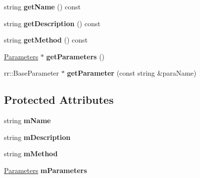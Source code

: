 \begin{DoxyCompactItemize}
\item 
\hypertarget{classrr_1_1_capability_a4702e391046b50e4401097f944d4e871}{string {\bfseries get\-Name} () const }\label{classrr_1_1_capability_a4702e391046b50e4401097f944d4e871}

\item 
\hypertarget{classrr_1_1_capability_ab68dd9acb7970dfefb83887f43216ead}{string {\bfseries get\-Description} () const }\label{classrr_1_1_capability_ab68dd9acb7970dfefb83887f43216ead}

\item 
\hypertarget{classrr_1_1_capability_ac160de57c4711c5f7b4809f9e476c792}{string {\bfseries get\-Method} () const }\label{classrr_1_1_capability_ac160de57c4711c5f7b4809f9e476c792}

\item 
\hypertarget{classrr_1_1_capability_aa1e9e2b73a8eb3f57914457fa4b45672}{\hyperlink{classrr_1_1_parameters}{Parameters} $\ast$ {\bfseries get\-Parameters} ()}\label{classrr_1_1_capability_aa1e9e2b73a8eb3f57914457fa4b45672}

\item 
\hypertarget{classrr_1_1_capability_a6e48b0fd81980ca003e8b31b4766e648}{rr\-::\-Base\-Parameter $\ast$ {\bfseries get\-Parameter} (const string \&para\-Name)}\label{classrr_1_1_capability_a6e48b0fd81980ca003e8b31b4766e648}

\end{DoxyCompactItemize}
\subsection*{Protected Attributes}
\begin{DoxyCompactItemize}
\item 
\hypertarget{classrr_1_1_capability_abe5792de2c888966e3c742de6be4ab8c}{string {\bfseries m\-Name}}\label{classrr_1_1_capability_abe5792de2c888966e3c742de6be4ab8c}

\item 
\hypertarget{classrr_1_1_capability_a71853fd6acd9b55ebf4e35ca64ee11c7}{string {\bfseries m\-Description}}\label{classrr_1_1_capability_a71853fd6acd9b55ebf4e35ca64ee11c7}

\item 
\hypertarget{classrr_1_1_capability_ac37d06d991168f03e494d55d68833e35}{string {\bfseries m\-Method}}\label{classrr_1_1_capability_ac37d06d991168f03e494d55d68833e35}

\item 
\hypertarget{classrr_1_1_capability_afb5c1a18d3684356a9ae8686529bb5eb}{\hyperlink{classrr_1_1_parameters}{Parameters} {\bfseries m\-Parameters}}\label{classrr_1_1_capability_afb5c1a18d3684356a9ae8686529bb5eb}

\end{DoxyCompactItemize}

